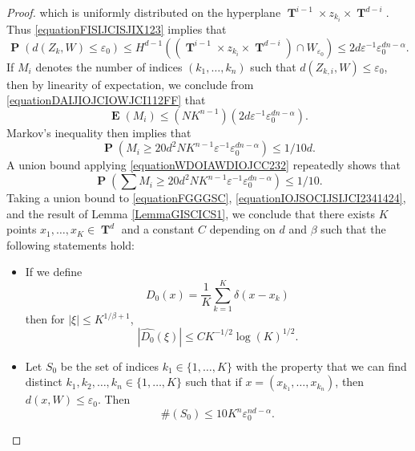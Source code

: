 \documentclass[12pt,reqno]{article}
\numberwithin{equation}{section}
\DeclareMathOperator{\TT}{\mathbf{T}}
\DeclareMathOperator{\EE}{\mathbf{E}}
\DeclareMathOperator{\PP}{\mathbf{P}}
\begin{document}
\begin{proof}
    which is uniformly distributed on the hyperplane $\TT^{i-1} \times z_{k_i} \times \TT^{d-i}$. Thus \eqref{equationFISIJCISJIX123} implies that
    \begin{equation} \label{equationDAIJIOJCIOWJCI112FF}
        \PP(d(Z_k,W) \leq \varepsilon_0) \leq H^{d-1} \left( (\TT^{i-1} \times z_{k_i} \times \TT^{d-i}) \cap W_{\varepsilon_0} \right) \leq 2d \varepsilon^{-1} \varepsilon_0^{dn - \alpha}.
    \end{equation}
    If $M_i$ denotes the number of indices $(k_1, \dots, k_n)$ such that $d(Z_{k,i},W) \leq \varepsilon_0$, then by linearity of expectation, we conclude from \eqref{equationDAIJIOJCIOWJCI112FF} that
    \[ \EE(M_i) \leq (N K^{n-1}) (2d \varepsilon^{-1} \varepsilon_0^{dn-\alpha}). \]
    Markov's inequality then implies that 
    \begin{equation} \label{equationWDOIAWDIOJCC232}
        \PP(M_i \geq 20 d^2 N K^{n-1} \varepsilon^{-1} \varepsilon_0^{dn - \alpha}) \leq 1/10d.
    \end{equation}
    A union bound applying \eqref{equationWDOIAWDIOJCC232} repeatedly shows that
    \begin{equation} \label{equationIOJSOCIJSIJCI2341424}
        \PP \left( \sum M_i \geq 20 d^2 N K^{n-1} \varepsilon^{-1} \varepsilon_0^{dn-\alpha} \right) \leq 1/10.
    \end{equation}
    Taking a union bound to \eqref{equationFGGGSC}, \eqref{equationIOJSOCIJSIJCI2341424}, and the result of Lemma \ref{LemmaGISCICS1}, we conclude that there exists $K$ points $x_1, \dots, x_K \in \TT^d$ and a constant $C$ depending on $d$ and $\beta$ such that the following statements hold:
    \begin{itemize}
        \item If we define
        \[ D_0(x) = \frac{1}{K} \sum_{k = 1}^K \delta(x - x_k) \]
        then for $|\xi| \leq K^{1/\beta + 1}$,
        \begin{equation} \label{equationGGGISCI11242}
            |\widehat{D_0}(\xi)| \leq C K^{-1/2} \log(K)^{1/2}.
        \end{equation}

        \item Let $S_0$ be the set of indices $k_1 \in \{ 1, \dots, K \}$ with the property that we can find distinct $k_1, k_2, \dots, k_n \in \{ 1, \dots, K \}$ such that if $x = (x_{k_1}, \dots, x_{k_n})$, then $d(x, W) \leq \varepsilon_0$. Then
        \begin{equation} \label{equationGGSC99124}
            \#(S_0) \leq 10 K^n \varepsilon_0^{nd-\alpha}.
        \end{equation}


\end{itemize}
\end{proof}
\end{document}
